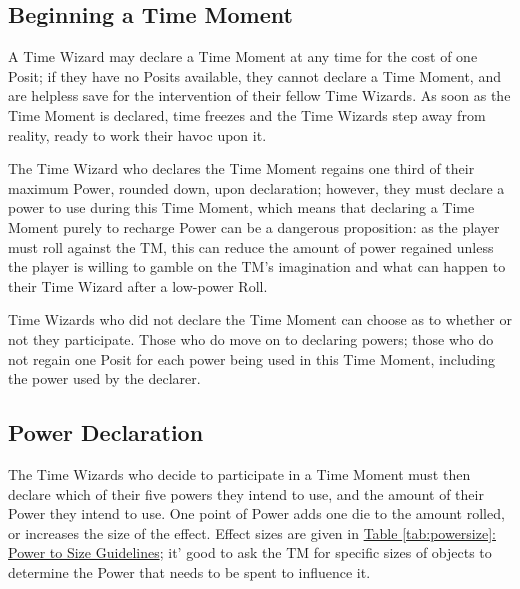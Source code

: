 \documentclass[twoside]{article}
\begin{document}
\subsection{Beginning a Time Moment} \label{ssec:begin-moment}
A Time Wizard may declare a Time Moment at any time for the cost of one Posit; if they have no
Posits available, they cannot declare a Time Moment, and are helpless save for the intervention
of their fellow Time Wizards. As soon as the Time Moment is declared, time freezes and the
Time Wizards step away from reality, ready to work their havoc upon it.

The Time Wizard who declares the Time Moment regains one third of their maximum Power, rounded
down, upon declaration; however, they must declare a power to use during this Time Moment, which
means that declaring a Time Moment purely to recharge Power can be a dangerous proposition: as
the player must roll against the TM, this can reduce the amount of power regained unless the
player is willing to gamble on the TM's imagination and what can happen to their Time Wizard
after a low-power Roll.

Time Wizards who did not declare the Time Moment can choose as to whether or not they
participate. Those who do move on to declaring powers; those who do not regain one Posit for
each power being used in this Time Moment, including the power used by the declarer.

\subsection{Power Declaration} \label{ssec:power-declaration}
The Time Wizards who decide to participate in a Time Moment must then declare which of their
five powers they intend to use, and the amount of their Power they intend to use. One point of
Power adds one die to the amount rolled, or increases the size of the effect. Effect sizes are
given in \hyperref[tab:powersize]{Table \ref*{tab:powersize}: Power to Size Guidelines}; it'
good to ask the TM for specific sizes of objects to determine the Power that needs to be spent
to influence it.
\end{document}
